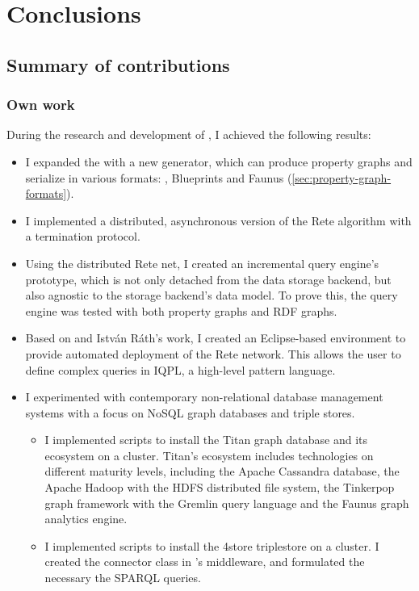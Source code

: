 \chapter{Conclusions}
\label{chap:conclusions}

\section{Summary of contributions}

\subsection{Own work}

During the research and development of \iqd{}, I achieved the following results:

\begin{itemize}
  \item I expanded the \tb{} with a new generator, which can produce property graphs and serialize in various formats: \graphml{}, Blueprints \graphson{} and Faunus \graphson{} (\autoref{sec:property-graph-formats}).
  \item I implemented a distributed, asynchronous version of the Rete algorithm with a termination protocol.
  \item Using the distributed Rete net, I created an incremental query engine's prototype, which is not only detached from the data storage backend, but also agnostic to the storage backend's data model. To prove this, the query engine was tested with both property graphs and RDF graphs. 
  \item Based on \eiq{} and István Ráth's work, I created an Eclipse-based environment to provide automated deployment of the Rete network. This allows the user to define complex queries in IQPL, a high-level pattern language. 
  \item I experimented with contemporary non-relational database management systems with a focus on NoSQL graph databases and triple stores.
  \begin{itemize}
    \item I implemented scripts to install the Titan graph database and its ecosystem on a cluster. Titan's ecosystem includes technologies on different maturity levels, including the Apache Cassandra database, the Apache Hadoop with the HDFS distributed file system, the Tinkerpop graph framework with the Gremlin query language and the Faunus graph analytics engine.
    \item I implemented scripts to install the 4store triplestore on a cluster. I created the connector class in \iqd{}'s middleware, and formulated the necessary the SPARQL queries. 

\end{itemize}
\end{itemize}
